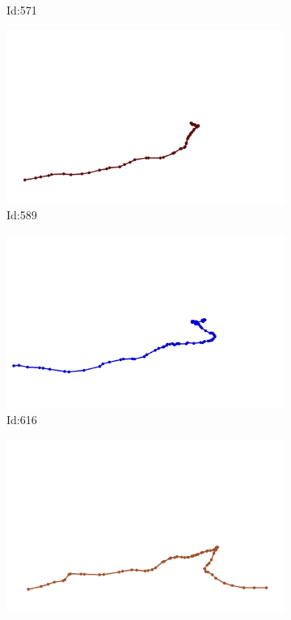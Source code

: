 \documentclass[12pt,twoside]{report}
\begin{document}
\begin{figure}
\begin{subfigure}[b]{0.20\textwidth}
\caption{Id:571}
\end{subfigure}
\begin{subfigure}[b]{0.20\textwidth}
\centering
\includegraphics[width=\textwidth]{../trajectories/589.png}
\caption{Id:589}
\end{subfigure}
\begin{subfigure}[b]{0.20\textwidth}
\centering
\includegraphics[width=\textwidth]{../trajectories/616.png}
\caption{Id:616}
\end{subfigure}
\begin{subfigure}[b]{0.20\textwidth}
\centering
\includegraphics[width=\textwidth]{../trajectories/628.png}

\end{subfigure}
\end{figure}
\end{document}
